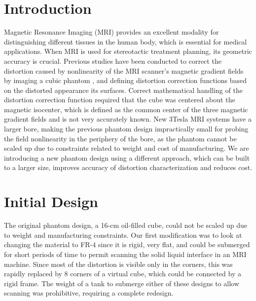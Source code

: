 \section{Introduction}

Magnetic Resonance Imaging (MRI) provides an excellent modality for distinguishing different tissues in the
human body, which is essential for medical applications. When MRI is used for stereotactic treatment planning,
its geometric accuracy is crucial. Previous studies have been conducted to correct the distortion caused by
nonlinearity of the MRI scanner’s magnetic gradient fields by imaging a cubic phantom \cite{Lang99},
\cite{LSS08b} and defining
distortion correction functions based on the distorted appearance its surfaces. Correct mathematical handling
of the distortion correction function required that the cube was centered about the magnetic isocenter, which
is defined as the common center of the three magnetic gradient fields and  is not very accurately known.
New 3Tesla MRI systems have a larger bore, making the previous phantom design impractically small for probing
the field nonlinearity in the periphery of the bore, as the phantom cannot be scaled up due to constraints
related to weight and cost of manufacturing. We are introducing a new phantom design using a different
approach, which can be built to a larger size, improves accuracy of distortion characterization and reduces
cost.

\section{Initial Design}

The original phantom design, a 16-cm oil-filled cube, could not be scaled up due to weight and manufacturing
constraints. Our first modification was to look at changing the material to FR-4 since it is rigid, very flat,
and could be submerged for short periods of time to permit scanning the solid liquid interface in an MRI
machine.  Since most of the distortion is visible only in the corners, this was rapidly replaced by 8 corners
of a virtual cube, which could be connected by a rigid frame.  The weight of a tank to submerge either of
these designs to allow scanning was prohibitive, requiring a complete redesign.

